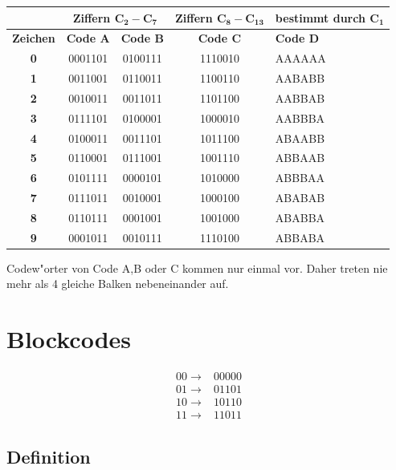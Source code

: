 \begin{center}
	\begin{tabular}{| c | c | c | c | p{2cm} |}
	\hline
	 &\multicolumn{2}{|c|}{\textbf{Ziffern $\mathbf{C_2 - C_7}$}} & \textbf{Ziffern $\mathbf{C_8 - C_{13}}$} & \textbf{bestimmt durch} $\mathbf{C_1}$ \\
	\hline
	\textbf{Zeichen} & \textbf{Code A} & \textbf{Code B} & \textbf{Code C} & \textbf{Code D}\\
	\hline
	\textbf{0} &	0001101 &	0100111 &	1110010 &	AAAAAA\\
	\textbf{1} &	0011001 &	0110011 &	1100110 &	AABABB\\
	\textbf{2} &	0010011 &	0011011 &	1101100 &	AABBAB\\
	\textbf{3} &	0111101 &	0100001 &	1000010 &	AABBBA\\
	\textbf{4} &	0100011 &	0011101 &	1011100 &	ABAABB\\
	\textbf{5} &	0110001 &	0111001 &	1001110 &	ABBAAB\\
	\textbf{6} &	0101111 &	0000101 &	1010000 &	ABBBAA\\
	\textbf{7} &	0111011 &	0010001 &	1000100 & 	ABABAB\\
	\textbf{8} &	0110111 &	0001001 &	1001000 &	ABABBA\\
	\textbf{9} &	0001011 &	0010111 &	1110100 &	ABBABA\\
	\hline
	\end{tabular}
\end{center}
Codew"orter von Code A,B oder C kommen nur einmal vor. Daher treten nie mehr als 4 gleiche Balken nebeneinander auf. \\

\section{Blockcodes}
\begin{align*}
	00 \rightarrow & 00000\\
	01 \rightarrow & 01101\\
	10 \rightarrow & 10110\\
	11 \rightarrow & 11011
\end{align*}

\subsection{Definition}

